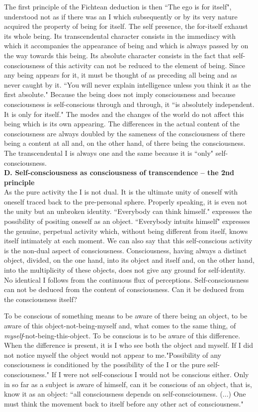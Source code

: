 The first principle of the Fichtean deduction is then ``The ego is for itself", understood not as if there was an I 
which subsequently or by its very nature acquired the property of being for itself. The self presence, the for-itself 
exhaust its whole being. Its transcendental character consists in the immediacy with which it accompanies the 
appearance of being and which is always passed by on the way towards this being. Its absolute character consists in 
the fact that self-consciousness of this activity can not be reduced to the element of being. Since any being appears 
for it, it must be thought of as preceding all being and as never caught by it. ``You will never explain intelligence 
unless you think it as the first absolute." \cite{ITS} Because the being does not imply consciousness and because 
consciousness is self-conscious through and through, it ``is absolutely independent. It is only for itself." \cite{ITS} The 
modes and the changes of the world do not affect this being which is its own appearing. The differences in the 
actual content of the consciousness are always doubled by the sameness of the consciousness of there being a 
content at all and, on the other hand, of there being the consciousness. The transcendental I is always one and the 
same because it is ``only" self-consciousness. \\[1ex]
{\bf D. Self-consciousness as consciousness of transcendence -- the 2nd principle} \\
As the pure activity the I is not dual. It is the ultimate unity of oneself with oneself traced back to the pre-personal sphere. Properly speaking, it is even not the unity but an unbroken identity. ``Everybody can think 
himself." expresses the possibility of positing oneself as an object. ``Everybody intuits himself" expresses the 
genuine, perpetual activity which, without being different from itself, knows itself intimately at each moment. We 
can also say that this self-conscious activity is the non-dual aspect of consciousness. Consciousness, having 
always a distinct object, divided, on the one hand, into its object and itself and, on the other hand, into the 
multiplicity of these objects, does not give any ground for self-identity. No identical I follows from the continuous 
flux of perceptions. Self-consciousness can not be deduced from the content of consciousness. Can it be deduced 
from the consciousness itself?

To be conscious of something means to be aware of there being an object, to be aware of this object-not-being-myself and, what comes to the same thing, of {\em myself}-not-being-this-object. To be conscious is to be aware of this 
difference. When the difference is present, it is I who see both the object and myself. If I did not notice myself the 
object would not appear to me."Possibility of any consciousness is conditioned by the possibility of the I or the 
pure self-consciousness." \cite{ITS} If I were not self-conscious I would not be conscious either. Only in so far as a subject 
is aware of himself, can it be conscious of an object, that is, know it as an object: ``all consciousness depends on 
self-consciousness. (...) One must think the movement back to itself before any other act of consciousness." \cite{ITS} 

